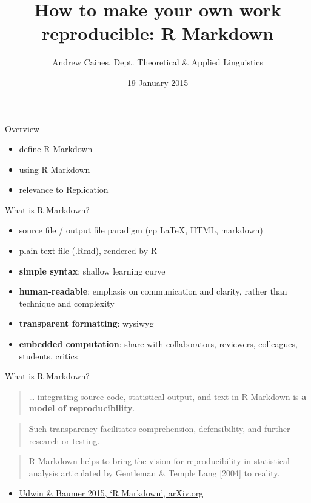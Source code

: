 \documentclass[ignorenonframetext,]{beamer}
\title{How to make your own work reproducible: R Markdown}
\author{Andrew Caines, Dept. Theoretical \& Applied Linguistics}
\date{19 January 2015}
\begin{document}
\frame{\titlepage}

\begin{frame}
\tableofcontents[hideallsubsections]
\end{frame}

\begin{frame}{Overview}

\begin{itemize}[<+->]
\itemsep1pt\parskip0pt
\item
  define R Markdown
\item
  using R Markdown
\item
  relevance to Replication
\end{itemize}

\end{frame}

\begin{frame}{What is R Markdown?}

\begin{itemize}[<+->]
\itemsep1pt\parskip0pt
\item
  source file / output file paradigm (cp LaTeX, HTML, markdown)
\item
  plain text file (.Rmd), rendered by R
\item
  \textbf{simple syntax}: shallow learning curve
\item
  \textbf{human-readable}: emphasis on communication and clarity, rather
  than technique and complexity
\item
  \textbf{transparent formatting}: wysiwyg
\item
  \textbf{embedded computation}: share with collaborators, reviewers,
  colleagues, students, critics
\end{itemize}

\end{frame}

\begin{frame}{What is R Markdown?}

\begin{quote}
\ldots{} integrating source code, statistical output, and text in R
Markdown is \textbf{a model of reproducibility}.
\end{quote}

\begin{quote}
Such transparency facilitates comprehension, defensibility, and further
research or testing.
\end{quote}

\begin{quote}
R Markdown helps to bring the vision for reproducibility in statistical
analysis articulated by Gentleman \& Temple Lang {[}2004{]} to reality.
\end{quote}

\begin{itemize}[<+->]
\itemsep1pt\parskip0pt
\item
  \href{http://arxiv.org/abs/1501.01613}{Udwin \& Baumer 2015, `R
  Markdown', arXiv.org}
\end{itemize}

\end{frame}
\end{document}

